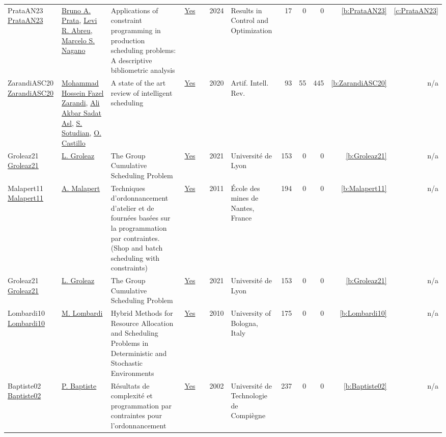 {\begin{longtable}{>{\raggedright\arraybackslash}p{3cm}>{\raggedright\arraybackslash}p{6cm}>{\raggedright\arraybackslash}p{6.5cm}rrrp{2.5cm}rrrrr}
PrataAN23 \href{https://www.sciencedirect.com/science/article/pii/S2666720723001522}{PrataAN23} & \hyperref[auth:a388]{Bruno A. Prata}, \hyperref[auth:a389]{Levi R. Abreu}, \hyperref[auth:a390]{Marcelo S. Nagano} & Applications of constraint programming in production scheduling problems: A descriptive bibliometric analysis & \href{../works/PrataAN23.pdf}{Yes} & \cite{PrataAN23} & 2024 & Results in Control and Optimization & 17 & 0 & 0 & \ref{b:PrataAN23} & \ref{c:PrataAN23}\\
ZarandiASC20 \href{https://doi.org/10.1007/s10462-018-9667-6}{ZarandiASC20} & \hyperref[auth:a835]{Mohammad Hossein Fazel Zarandi}, \hyperref[auth:a836]{Ali Akbar Sadat Asl}, \hyperref[auth:a837]{S. Sotudian}, \hyperref[auth:a838]{O. Castillo} & A state of the art review of intelligent scheduling & \href{../works/ZarandiASC20.pdf}{Yes} & \cite{ZarandiASC20} & 2020 & Artif. Intell. Rev. & 93 & 55 & 445 & \ref{b:ZarandiASC20} & n/a\\
Groleaz21 \href{https://hal.science/tel-03266690}{Groleaz21} & \hyperref[auth:a83]{L. Groleaz} & {The Group Cumulative Scheduling Problem} & \href{../works/Groleaz21.pdf}{Yes} & \cite{Groleaz21} & 2021 & {Universit{\'e} de Lyon} & 153 & 0 & 0 & \ref{b:Groleaz21} & n/a\\
Malapert11 \href{https://tel.archives-ouvertes.fr/tel-00630122}{Malapert11} & \hyperref[auth:a82]{A. Malapert} & Techniques d'ordonnancement d'atelier et de fourn{\'{e}}es bas{\'{e}}es sur la programmation par contraintes. (Shop and batch scheduling with constraints) & \href{../works/Malapert11.pdf}{Yes} & \cite{Malapert11} & 2011 & {\'{E}}cole des mines de Nantes, France & 194 & 0 & 0 & \ref{b:Malapert11} & n/a\\
Groleaz21 \href{https://hal.science/tel-03266690}{Groleaz21} & \hyperref[auth:a83]{L. Groleaz} & {The Group Cumulative Scheduling Problem} & \href{../works/Groleaz21.pdf}{Yes} & \cite{Groleaz21} & 2021 & {Universit{\'e} de Lyon} & 153 & 0 & 0 & \ref{b:Groleaz21} & n/a\\
Lombardi10 \href{http://amsdottorato.unibo.it/2961/}{Lombardi10} & \hyperref[auth:a143]{M. Lombardi} & Hybrid Methods for Resource Allocation and Scheduling Problems in Deterministic and Stochastic Environments & \href{../works/Lombardi10.pdf}{Yes} & \cite{Lombardi10} & 2010 & University of Bologna, Italy & 175 & 0 & 0 & \ref{b:Lombardi10} & n/a\\
Baptiste02 \href{https://theses.hal.science/tel-00124998}{Baptiste02} & \hyperref[auth:a163]{P. Baptiste} & {R{\'e}sultats de complexit{\'e} et programmation par contraintes pour l'ordonnancement} & \href{../works/Baptiste02.pdf}{Yes} & \cite{Baptiste02} & 2002 & {Universit{\'e} de Technologie de Compi{\`e}gne} & 237 & 0 & 0 & \ref{b:Baptiste02} & n/a\\

\end{longtable}}
